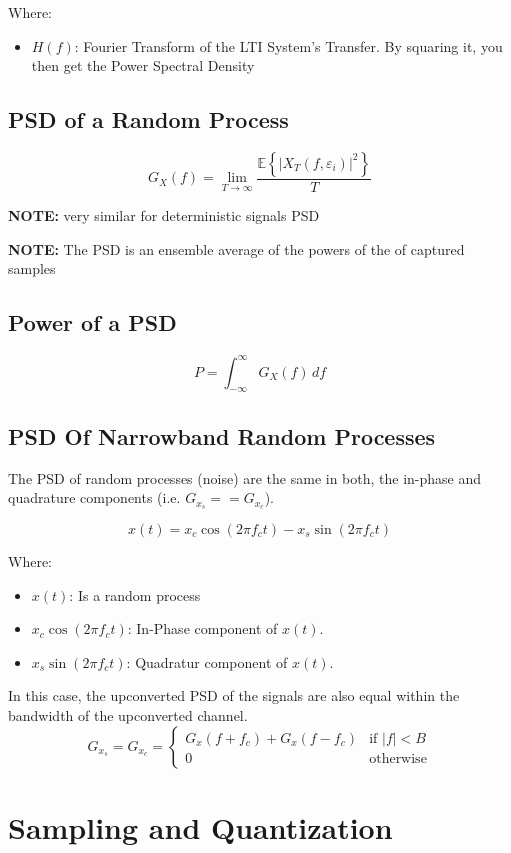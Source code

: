 \documentclass[12pt]{article}
\begin{document}
\noindent Where:
\begin{itemize}
    \item $H(f)$: Fourier Transform of the LTI System's Transfer. By squaring it, you then get the Power Spectral Density
\end{itemize}

\subsection{PSD of a Random Process}
\[
G_X(f) = \lim_{T \to \infty} \frac{\mathbb{E} \left\{ |X_T(f, \varepsilon_i)|^2 \right\}}{T}
\]

\noindent\textbf{NOTE:} very similar for deterministic signals PSD

\noindent\textbf{NOTE:} The PSD is an ensemble average of the powers of the of captured samples

\subsection{Power of a PSD}
\[
    P = \int_{-\infty}^{\infty} G_X(f) \, d\!f 
\]

\subsection{PSD Of Narrowband Random Processes}
The PSD of random processes (noise) are the same in both, the in-phase and quadrature components (i.e. $G_{x_s} == G_{x_c}$).

\[
    x(t) = x_c \cos(2\pi f_c t) - x_s \sin(2 \pi f_c t)
\]

\noindent Where:
\begin{itemize}
    \item $x(t)$: Is a random process
    \item $x_c\cos(2\pi f_c t)$: In-Phase component of $x(t)$.
    \item $x_s\sin(2\pi f_c t)$: Quadratur component of $x(t)$.
\end{itemize}

In this case, the upconverted PSD of the signals are also equal within the bandwidth of the upconverted channel.
\[
    G_{x_s} = G_{x_c} =
    \begin{cases}
      G_x(f + f_c) + G_x(f - f_c) & \text{if } |f| < B\\
      0 & \text{otherwise}
   \end{cases}
\]

\section{Sampling and Quantization}
\end{document}

